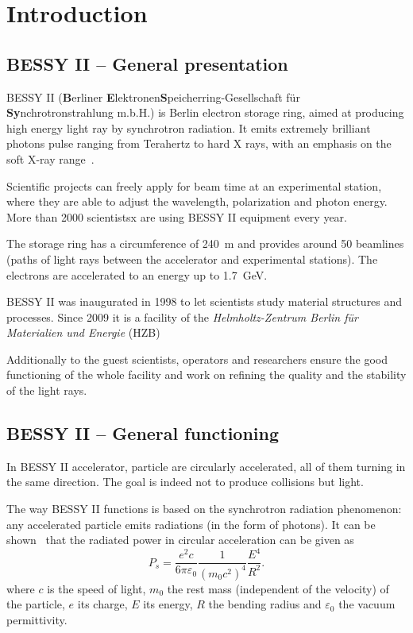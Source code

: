 \chapter{Introduction}
\label{sec:background}

\section{BESSY II -- General presentation}
BESSY II (\textbf{B}erliner \textbf{E}lektronen\-\textbf{S}peicherring-Gesellschaft für \textbf{Sy}n\-chro\-tron\-strahlung m.b.H.) is Berlin electron storage ring, aimed at producing high energy light ray by synchrotron radiation. It emits extremely brilliant photons pulse ranging from Terahertz to hard X rays, with an emphasis on the soft X-ray range~\cite{web:bessy_homepage}.

Scientific projects can freely apply for beam time at an experimental station, where they are able to adjust the wavelength, polarization and photon energy. More than 2000 scientistsx are using BESSY II equipment every year.

The storage ring has a circumference of \SI{240}{\meter} and provides around 50 beamlines (paths of light rays between the accelerator and experimental stations). The electrons are accelerated to an energy up to \SI{1.7}{\giga\electronvolt}.

BESSY II was inaugurated in 1998 to let scientists study material structures and processes. Since 2009 it is a facility of the \textit{Helmholtz-Zentrum Berlin für Materialien und Energie} (HZB)

Additionally to the guest scientists, operators and researchers ensure the good functioning of the whole facility and work on refining the quality and the stability of the light rays.

\section{BESSY II -- General functioning}
In BESSY II  accelerator, particle are circularly accelerated, all of them turning in the same direction. The goal is indeed not to produce collisions but light.

The way BESSY II functions is based on the synchrotron radiation phenomenon: any accelerated particle emits radiations (in the form of photons). It can be shown~\cite{book:wille} that the radiated power in circular acceleration can be given as
\begin{equation}
P_s = \frac{e^2 c}{6 \pi \varepsilon_0}\frac{1}{(m_0 c^2)^4}\frac{E^4}{R^2}.
\end{equation}
where $c$ is the speed of light, $m_0$ the rest mass (independent of the velocity) of the particle, $e$ its charge, $E$ its energy, $R$ the bending radius and $\varepsilon_0$ the  vacuum permittivity.

